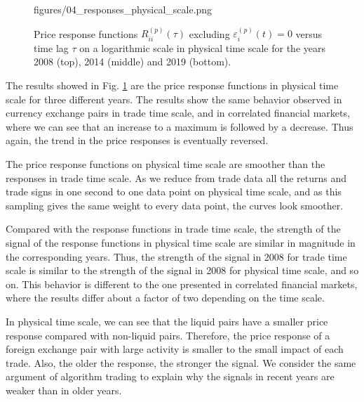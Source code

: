 \begin{figure}[htbp]
    {figures/04_responses_physical_scale.png}
    \caption{Price response functions
             $R^{\left(p\right)}_{ii}\left(\tau\right)$ excluding
             $\varepsilon^{\left(p\right)}_{i}\left(t\right) = 0$ versus time
             lag $\tau$ on a logarithmic scale in physical time scale for the
             years 2008 (top), 2014 (middle) and 2019 (bottom).}
    \label{fig:response_function_physical_scale}
\end{figure}

The results showed in Fig. \ref{fig:response_function_physical_scale} are the
price response functions in physical time scale for three different years. The
results show the same behavior observed in currency exchange pairs in trade
time scale, and in correlated financial markets, where we can see that an
increase to a maximum is followed by a decrease. Thus again, the trend in the
price responses is eventually reversed.

The price response functions on physical time scale are smoother than the
responses in trade time scale. As we reduce from trade data all the returns and
trade signs in one second to one data point on physical time scale, and as this
sampling gives the same weight to every data point, the curves look smoother.

Compared with the response functions in trade time scale, the strength of the
signal of the response functions in physical time scale are similar in
magnitude in the corresponding years. Thus, the strength of the signal in 2008
for trade time scale is similar to the strength of the signal in 2008 for
physical time scale, and so on. This behavior is different to the one presented
in correlated financial markets, where the results differ about a factor of
two depending on the time scale.

In physical time scale, we can see that the liquid pairs have a smaller price
response compared with non-liquid pairs. Therefore, the price response of a
foreign exchange pair with large activity is smaller to the small impact of
each trade. Also, the older the response, the stronger the signal. We consider
the same argument of algorithm trading to explain why the signals in recent
years are weaker than in older years.
